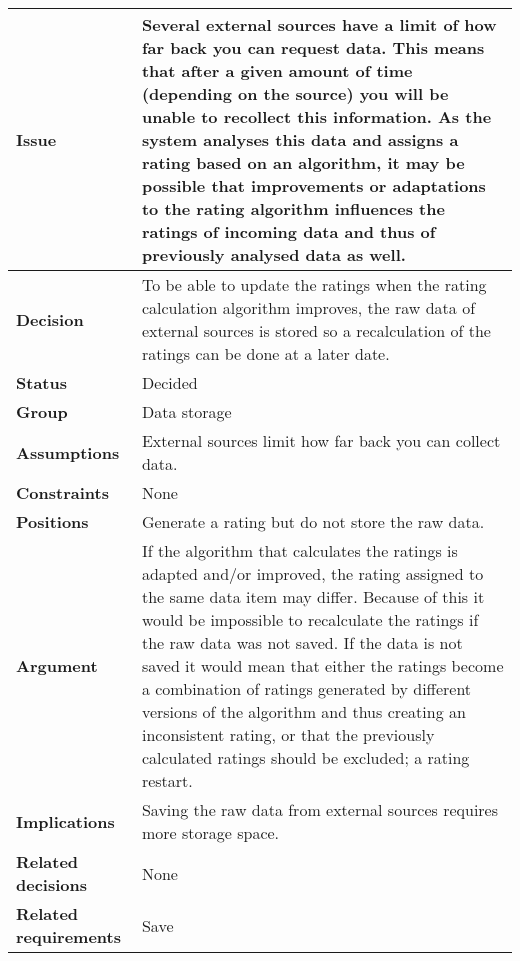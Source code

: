 
\begin{tabular}{ l  p{10cm}}
\hline
\bf Issue & Several external sources have a limit of how far back you can request data. This means that after a given amount of time (depending on the source) you will be unable to recollect this information. As the system analyses this data and assigns a rating based on an algorithm, it may be possible that improvements or adaptations to the rating algorithm influences the ratings of incoming data and thus of previously analysed data as well. \\
\hline
\bf Decision & To be able to update the ratings when the rating calculation algorithm improves, the raw data of external sources is stored so a recalculation of the ratings can be done at a later date. \\
\hline
\bf Status & Decided \\
\hline
\bf Group & Data storage \\
\hline
\bf Assumptions & External sources limit how far back you can collect data. \\
\hline
\bf Constraints & None\\
\hline
\bf Positions & Generate a rating but do not store the raw data. \\
\hline
\bf Argument & If the algorithm that calculates the ratings is adapted and/or improved, the rating assigned to the same data item may differ. Because of this it would be impossible to recalculate the ratings if the raw data was not saved. \newline
If the data is not saved it would mean that either the ratings become a combination of ratings generated by different versions of the algorithm and thus creating an inconsistent rating, or that the previously calculated ratings should be excluded; a rating restart. \\
\hline
\bf Implications & Saving the raw data from external sources requires more storage space. \\
\hline
\bf Related decisions & None \\
\hline
\bf Related requirements & Save \\
\hline
\end{tabular}
